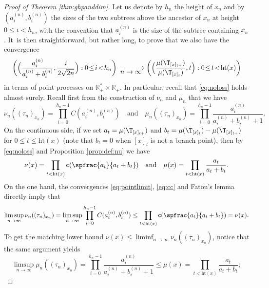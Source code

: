 \begin{proof}[Proof of Theorem \ref{thm:ghpanddim}]
Let us denote by $h_n$ the height of $x_n$ and by $(a^{(n)}_i,b^{(n)}_i)$ the sizes of the two subtrees above the ancestor of $x_n$ at height $0\leq i < h_n$, with the convention that $a^{(n)}_i$ is the size of the subtree containing $x_n$. It~is then straightforward, but rather long, to prove that we also have the convergence\vspace*{-3pt}\enlargethispage{\baselineskip}
\begin{equation} \label{eq:pointlimit} \biggl(\Bigl(\frac{a_i^{(n)}}{a_i^{(n)}+b_i^{(n)}} , \frac{i}{ 2\sqrt{2n}} \Bigr) : 0 \!\leq\! i \!<\! h_n \biggr) \xrightarrow[\textstyle n \to \infty]{}\biggl(\Bigl(\frac{\mu(\T_{[x]_{t+}})}{\mu(\T_{[x]_{t}})},t \Bigr) : 0 \!\leq\! t\! <\! \mathrm{ht}(x) \biggr)
\end{equation}
in terms of point processes on $ \mathbb{R}_+^* \times \mathbb{R}_+$. In particular, recall that \eqref{eq:noloss} holds almost surely.
Recall first from the construction of $\nu_n$ and $\mu_n$ that we have\vspace*{-3pt}
\begin{equation} \label{rappelnun} \nu_n((\tau_n)_{x_n}) = \prod_{i=0}^{h_n-1} C(a_i^{(n)}, b_i^{(n)}) \quad \text{and} \quad \mu_n((\tau_n)_{x_n}) = \prod_{i=0}^{h_n-1} \frac{a_i^{(n)}}{a_i^{(n)}+b_i^{(n)}+1}.
\end{equation}
On the continuous side, if we set $a_t = \mu(\T_{[x]_{t+}})$ and $b_t = \mu(\T_{[x]_{t}})-\mu(\T_{[x]_{t+}})$ for $0 \leq t \leq \mathrm{ht}(x)$ (note that $b_t=0$ when $[x]_t$ is not a branch point), then by \eqref{eq:noloss} and Proposition \ref{prop:def:nu} we have\vspace*{-3pt}
\begin{equation} \label{rappelnu}\nu(x) = \prod_{t < \mathrm{ht}(x)} \mathsf{c}(\spfrac{a_t}{a_t+b_t}) \quad \text{and} \quad \mu(x) = \prod_{t < \mathrm{ht}(x)} \frac{a_t}{a_t+b_t}.
\end{equation}
On the one hand, the convergences \eqref{eq:pointlimit}, \eqref{eq:cc} and Fatou's lemma directly imply that\vspace*{-3pt}
\[
\limsup_{n \to \infty} \nu_n((\tau_n)_{x_n}) = \limsup_{n \to \infty}\prod_{i=0}^{h_n-1} C(a_i^{(n)}, b_i^{(n)}) \leq \prod_{t < \mathrm{ht}(x)} \mathsf{c}(\spfrac{a_t}{a_t+b_t}) =\nu(x).
\]
To get the matching lower bound $\nu(x)\leq \liminf_{n \to \infty} \nu_n((\tau_n)_{x_n})$, notice that the same argument yields\vspace*{-3pt}
\[
\limsup_{n \to \infty} \mu_n((\tau_n)_{x_n}) = \prod_{i=0}^{h_n-1} \frac{a_i^{(n)}}{a_i^{(n)}+b_i^{(n)}+1} \leq \mu(x) = \prod_{t < \mathrm{ht}(x)} \frac{a_t}{a_t+b_t};
\]
\end{proof}
